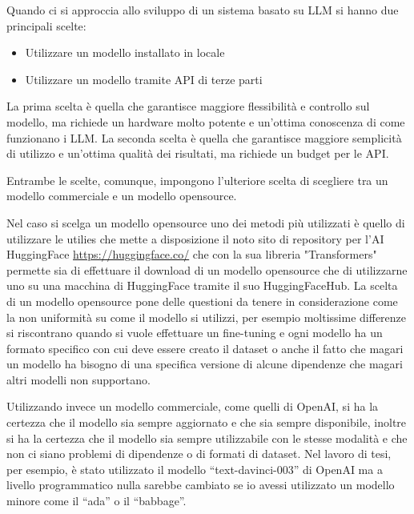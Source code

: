 Quando ci si approccia allo sviluppo di un sistema basato su LLM si hanno due principali scelte:
\begin{itemize}
    \item Utilizzare un modello installato in locale
    \item Utilizzare un modello tramite API di terze parti
\end{itemize}

La prima scelta è quella che garantisce maggiore flessibilità e controllo sul modello, ma richiede un hardware molto potente e un'ottima conoscenza di come funzionano i LLM.
La seconda scelta è quella che garantisce maggiore semplicità di utilizzo e un'ottima qualità dei risultati, ma richiede un budget per le API.

Entrambe le scelte, comunque, impongono l'ulteriore scelta di scegliere tra un modello commerciale e un modello opensource.

Nel caso si scelga un modello opensource uno dei metodi più utilizzati è quello di utilizzare le utilies che mette a disposizione il noto sito di repository per l'AI HuggingFace \url{https://huggingface.co/} che con la sua libreria "Transformers" permette sia di effettuare il download di un modello opensource che di utilizzarne uno su una macchina di HuggingFace tramite il suo HuggingFaceHub.
La scelta di un modello opensource pone delle questioni da tenere in considerazione come la non uniformità su come il modello si utilizzi, per esempio moltissime differenze si riscontrano quando si vuole effettuare un fine-tuning e ogni modello ha un formato specifico con cui deve essere creato il dataset o anche il fatto che magari un modello ha bisogno di una specifica versione di alcune dipendenze che magari altri modelli non supportano.

Utilizzando invece un modello commerciale, come quelli di OpenAI, si ha la certezza che il modello sia sempre aggiornato e che sia sempre disponibile, inoltre si ha la certezza che il modello sia sempre utilizzabile con le stesse modalità e che non ci siano problemi di dipendenze o di formati di dataset.
Nel lavoro di tesi, per esempio, è stato utilizzato il modello ``text-davinci-003'' di OpenAI ma a livello programmatico nulla sarebbe cambiato se io avessi utilizzato un modello minore come il ``ada'' o il ``babbage''.